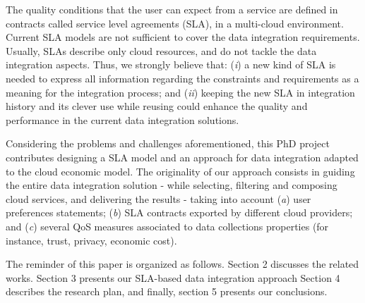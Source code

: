The quality conditions that the user can expect from a service are defined in
contracts called service level agreements (SLA), in a multi-cloud environment.
%
Current SLA models are not sufficient to cover the data integration requirements. 
%
Usually, SLAs describe only cloud resources, and do not tackle the data integration aspects. 
%
Thus, we strongly believe that: 
(\textit{i}) a new kind of SLA is needed to express all information regarding the constraints and requirements as a meaning for the integration process; and 
(\textit{ii}) keeping the new SLA in integration history and its clever use while reusing could enhance the quality and performance in the current data integration solutions. 

Considering the problems and challenges aforementioned, this PhD project
contributes designing a SLA model and an approach for data integration adapted
to the cloud economic model. The originality of our approach consists in guiding
the entire data integration solution - while selecting, filtering and composing
cloud services, and delivering the results - taking into account (\textit{a})
user preferences statements; (\textit{b}) SLA contracts exported by different
cloud providers; and (\textit{c}) several QoS measures associated to data
collections properties (for instance, trust, privacy, economic cost).    

The reminder of this paper is organized as follows.
Section 2 discusses the related works.
Section 3 presents our SLA-based data integration approach
Section 4 describes the research plan, and finally, section 5 presents
our conclusions.
